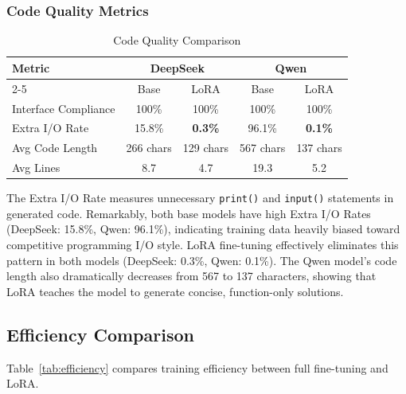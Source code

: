 \documentclass[conference]{IEEEtran}
\begin{document}
\subsubsection{Code Quality Metrics}

\begin{table}[htbp]
\caption{Code Quality Comparison}
\begin{center}
\begin{tabular}{|l|c|c|c|c|}
\hline
\textbf{Metric} & \multicolumn{2}{c|}{\textbf{DeepSeek}} & \multicolumn{2}{c|}{\textbf{Qwen}} \\
\cline{2-5}
 & Base & LoRA & Base & LoRA \\
\hline
Interface Compliance & 100\% & 100\% & 100\% & 100\% \\
Extra I/O Rate & 15.8\% & \textbf{0.3\%} & 96.1\% & \textbf{0.1\%} \\
Avg Code Length & 266 chars & 129 chars & 567 chars & 137 chars \\
Avg Lines & 8.7 & 4.7 & 19.3 & 5.2 \\
\hline
\end{tabular}
\label{tab:code_quality}
\end{center}
\end{table}

The Extra I/O Rate measures unnecessary \texttt{print()} and \texttt{input()} statements in generated code. Remarkably, both base models have high Extra I/O Rates (DeepSeek: 15.8\%, Qwen: 96.1\%), indicating training data heavily biased toward competitive programming I/O style. LoRA fine-tuning effectively eliminates this pattern in both models (DeepSeek: 0.3\%, Qwen: 0.1\%). The Qwen model's code length also dramatically decreases from 567 to 137 characters, showing that LoRA teaches the model to generate concise, function-only solutions.

\subsection{Efficiency Comparison}

Table~\ref{tab:efficiency} compares training efficiency between full fine-tuning and LoRA.
\end{document}
